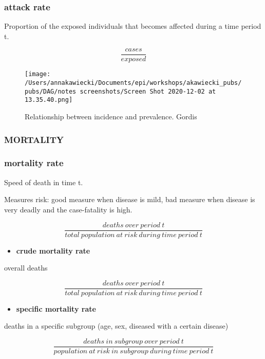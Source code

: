 \documentclass[
]{article}
\providecommand{\tightlist}{%
  \setlength{\itemsep}{0pt}\setlength{\parskip}{0pt}}
\begin{document}
\hypertarget{attack-rate}{%
\subsubsection{attack rate}\label{attack-rate}}

Proportion of the exposed individuals that becomes affected during a
time period t.

\[\frac{cases}{exposed}\]

\begin{figure}
\centering
\texttt{[image: /Users/annakawiecki/Documents/epi/workshops/akawiecki\_pubs/pubs/DAG/notes screenshots/Screen Shot 2020-12-02 at 13.35.40.png]}
\caption{Relationship between incidence and prevalence. Gordis}
\end{figure}

\hypertarget{mortality}{%
\subsubsection{MORTALITY}\label{mortality}}

\hypertarget{mortality-rate}{%
\subsubsection{mortality rate}\label{mortality-rate}}

Speed of death in time t.

Measures risk: good measure when disease is mild, bad measure when
disease is very deadly and the case-fatality is high.

\[\frac{deaths\:over\:period\:t}{total\:population\:at\:risk\:during\:time\:period\:t}\]

\begin{itemize}
\tightlist
\item
  \textbf{crude mortality rate}
\end{itemize}

overall deaths

\[\frac{deaths\:over\:period\:t}{total\:population\:at\:risk\:during\:time\:period\:t}\]

\begin{itemize}
\tightlist
\item
  \textbf{specific mortality rate}
\end{itemize}

deaths in a specific subgroup (age, sex, diseased with a certain
disease)

\[\frac{deaths\:in\:subgroup\:over\:period\:t}{population\:at\:risk\:in\:subgroup\:during\:time\:period\:t}\]
\end{document}
